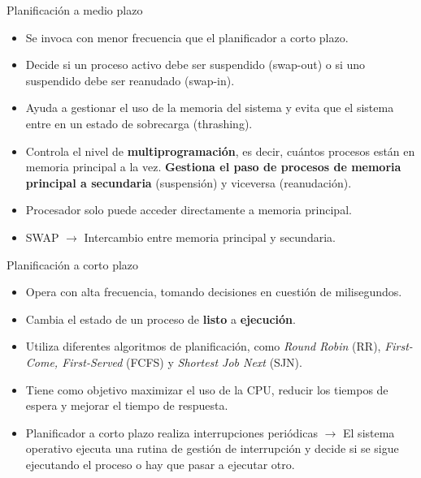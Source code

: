 \documentclass{beamer}
\begin{document}
\begin{frame}{Planificación a medio plazo}
        \begin{itemize}
        \item Se invoca con menor frecuencia que el planificador a corto plazo.
        \item Decide si un proceso activo debe ser suspendido (swap-out) o si uno suspendido debe ser reanudado (swap-in).
        \item Ayuda a gestionar el uso de la memoria del sistema y evita que el sistema entre en un estado de sobrecarga (thrashing).
        \item Controla el nivel de \textbf{multiprogramación}, es decir, cuántos procesos están en memoria principal a la vez.
        \textbf{Gestiona el paso de procesos de memoria principal a secundaria} (suspensión) y viceversa (reanudación).
        \item Procesador solo puede acceder directamente a memoria principal.
        \item SWAP $\to$ Intercambio entre memoria principal y secundaria.
    \end{itemize}
\end{frame}


\begin{frame}{Planificación a corto plazo}

    \begin{itemize}
        \item Opera con alta frecuencia, tomando decisiones en cuestión de milisegundos.
        \item Cambia el estado de un proceso de \textbf{listo} a \textbf{ejecución}.
        \item Utiliza diferentes algoritmos de planificación, como \textit{Round Robin} (RR), \textit{First-Come, First-Served} (FCFS) y \textit{Shortest Job Next} (SJN).
        \item Tiene como objetivo maximizar el uso de la CPU, reducir los tiempos de espera y mejorar el tiempo de respuesta.
        \item Planificador a corto plazo realiza interrupciones periódicas $\to$ El sistema operativo ejecuta una rutina de gestión de interrupción y decide si se sigue ejecutando el proceso o hay que pasar a ejecutar otro.

    \end{itemize}
\end{frame}
\end{document}
